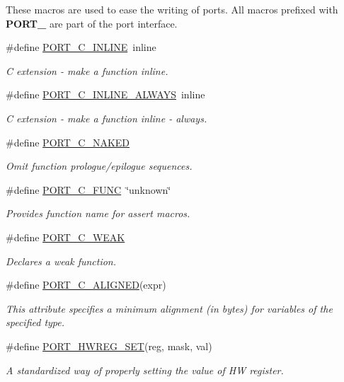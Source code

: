 These macros are used to ease the writing of ports. All macros prefixed with {\bfseries P\-O\-R\-T\-\_\-} are part of the port interface. \begin{DoxyCompactItemize}
\item 
\#define \hyperlink{group__template__compiler_ga87952d6e574c7f437503926e833ba345}{P\-O\-R\-T\-\_\-\-C\-\_\-\-I\-N\-L\-I\-N\-E}~inline
\begin{DoxyCompactList}\small\item\em C extension -\/ make a function inline. \end{DoxyCompactList}\item 
\#define \hyperlink{group__template__compiler_ga89152d5aab4045f552113b32920741ce}{P\-O\-R\-T\-\_\-\-C\-\_\-\-I\-N\-L\-I\-N\-E\-\_\-\-A\-L\-W\-A\-Y\-S}~inline
\begin{DoxyCompactList}\small\item\em C extension -\/ make a function inline -\/ always. \end{DoxyCompactList}\item 
\#define \hyperlink{group__template__compiler_gaf50b092bb255c796c99927cebbdb8631}{P\-O\-R\-T\-\_\-\-C\-\_\-\-N\-A\-K\-E\-D}
\begin{DoxyCompactList}\small\item\em Omit function prologue/epilogue sequences. \end{DoxyCompactList}\item 
\#define \hyperlink{group__template__compiler_ga6fe63660c6d0ccbabb032c026714863e}{P\-O\-R\-T\-\_\-\-C\-\_\-\-F\-U\-N\-C}~\char`\"{}unknown\char`\"{}
\begin{DoxyCompactList}\small\item\em Provides function name for assert macros. \end{DoxyCompactList}\item 
\#define \hyperlink{group__template__compiler_ga70c3ad4cff78229fae591d039b59f4d1}{P\-O\-R\-T\-\_\-\-C\-\_\-\-W\-E\-A\-K}
\begin{DoxyCompactList}\small\item\em Declares a weak function. \end{DoxyCompactList}\item 
\#define \hyperlink{group__template__compiler_ga4d6b8bd33e54fa5af4c5291c92dda288}{P\-O\-R\-T\-\_\-\-C\-\_\-\-A\-L\-I\-G\-N\-E\-D}(expr)
\begin{DoxyCompactList}\small\item\em This attribute specifies a minimum alignment (in bytes) for variables of the specified type. \end{DoxyCompactList}\item 
\#define \hyperlink{group__template__compiler_ga47fdf2153dba3df8c6a840829f02bd66}{P\-O\-R\-T\-\_\-\-H\-W\-R\-E\-G\-\_\-\-S\-E\-T}(reg, mask, val)
\begin{DoxyCompactList}\small\item\em A standardized way of properly setting the value of H\-W register. \end{DoxyCompactList}\end{DoxyCompactItemize}
